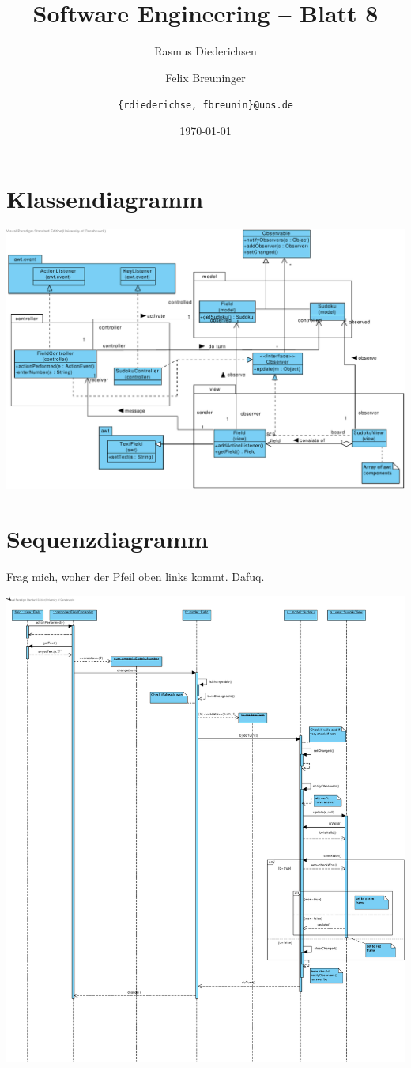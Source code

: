 \documentclass{scrartcl}
\title{\rmfamily Software Engineering -- Blatt 8}
\author{Rasmus Diederichsen \and Felix Breuninger\and 
   \texttt{\{rdiederichse, fbreunin\}@uos.de}
}
\date{\today}
\begin{document}
\selectfont
\maketitle

\section{Klassendiagramm}

\includegraphics[width=\linewidth]{Sudoku-MVC.pdf}

\section{Sequenzdiagramm}

Frag mich, woher der Pfeil oben links kommt. Dafuq.

\includegraphics[width=\linewidth]{Sudoku-SD.pdf}
\end{document}
